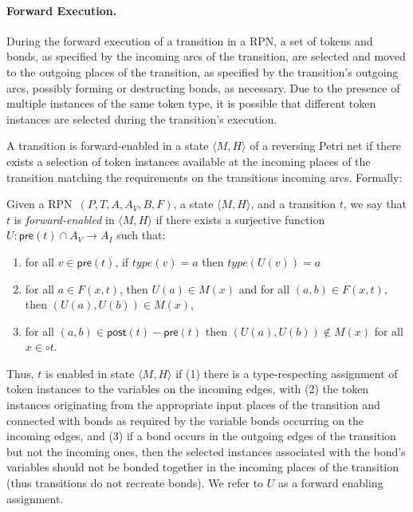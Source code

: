\documentclass[runningheads]{llncs}
\newcommand{\PN}{reversing Petri net }
\newcommand{\guard}[1]{\mathsf{pre}(#1)}
\newcommand{\effects}[1]{\mathsf{post}(#1)}
\newcommand{\state}[2]{\langle {#1}, {#2}\rangle}
\newcommand{\RPN}{\textsc{RPN\ }}
\newcommand{\type}{\mathit{type}}
\begin{document}
\paragraph{Forward Execution.}
During the forward execution of a transition in a RPN, 
a set of tokens and bonds, as specified by the incoming arcs of the transition, are selected and
moved to the outgoing places of the transition, as specified by the transition's outgoing arcs, possibly
forming or destructing bonds, as necessary. Due to the presence of multiple instances of the same token
type, it is possible that different token instances are selected during the transition's execution.  


A transition is forward-enabled in a state $\state{M}{H}$ of a \PN if there exists a selection of token instances 
available at the incoming places of the transition 
matching the requirements  on the transitions incoming arcs. Formally:

\begin{definition}\label{fenabled}{\rm
		Given a \RPN $(P,T, A, A_V, B, F)$, a state $\state{M}{H}$, and a transition $t$, we say that $t$ is 
		\emph{forward-enabled} in $\state{M}{H}$  if there exists a surjective function 
		$U:\guard{t}\cap A_V\rightarrow A_I$ such that:
		
		\begin{enumerate}
			\item  for all $v\in\guard{t}$, if $\type(v) = a$	then $\type(U(v))=a$
			\item for all $a\in F(x,t)$, then $U(a)\in M(x)$ and for all $(a,b)\in F(x,t)$, then $(U(a),U(b))\in M(x)$, 
			\item for all
			$(a,b)\in \effects{t}-\guard{t}$ then $(U(a),U(b))\not\in M(x)$ for all $x\in\circ t$.
		\end{enumerate}
}\end{definition}

Thus, $t$ is enabled in state $\state{M}{H}$ if  (1) there is a type-respecting assignment of token instances
to the variables on the incoming edges, with (2) the token instances originating from the appropriate
input places of the transition and  connected with
bonds as required by the variable bonds occurring on the incoming edges, and (3) if a bond
occurs in the outgoing edges of the transition but not the incoming ones, then the selected instances
associated with the bond's variables should not be bonded together in the incoming places
of the transition (thus transitions do not recreate bonds). We refer to $U$ as a forward enabling 
assignment.
\end{document}
